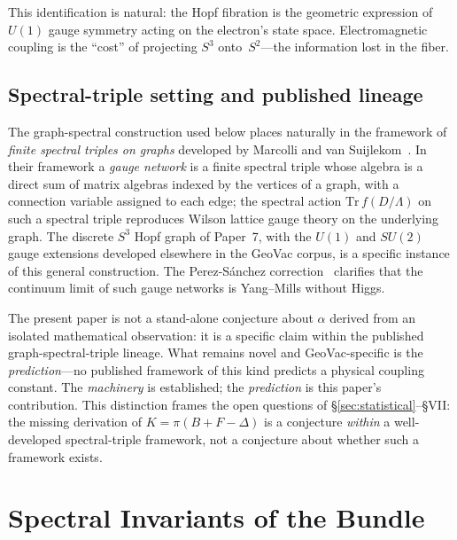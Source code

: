 \documentclass[aps,prl,twocolumn,superscriptaddress]{revtex4-2}
\begin{document}
This identification is natural: the Hopf fibration is the geometric
expression of $U(1)$ gauge symmetry acting on the electron's state
space. Electromagnetic coupling is the ``cost'' of projecting $S^3$
onto~$S^2$---the information lost in the fiber.


\subsection{Spectral-triple setting and published lineage}\label{sec:spectral_triple}

The graph-spectral construction used below places naturally in the
framework of \emph{finite spectral triples on graphs} developed by
Marcolli and van Suijlekom~\cite{marcolli_vs_2014}. In their framework
a \emph{gauge network} is a finite spectral triple whose algebra is a
direct sum of matrix algebras indexed by the vertices of a graph, with
a connection variable assigned to each edge; the spectral action
$\mathrm{Tr}\,f(D/\Lambda)$ on such a spectral triple reproduces Wilson
lattice gauge theory on the underlying graph. The discrete $S^3$ Hopf
graph of Paper~7, with the $U(1)$ and $SU(2)$ gauge extensions
developed elsewhere in the GeoVac corpus, is a specific instance of
this general construction. The Perez-S\'anchez
correction~\cite{perez_sanchez_2024, perez_sanchez_2024_comment}
clarifies that the continuum limit of such gauge networks is
Yang--Mills without Higgs.

The present paper is not a stand-alone conjecture about $\alpha$
derived from an isolated mathematical observation: it is a specific
claim within the published graph-spectral-triple lineage. What remains
novel and GeoVac-specific is the \emph{prediction}---no published
framework of this kind predicts a physical coupling constant. The
\emph{machinery} is established; the \emph{prediction} is this
paper's contribution. This distinction frames the open questions of
\S\ref{sec:statistical}--\S VII: the missing derivation of
$K = \pi(B + F - \Delta)$ is a conjecture \emph{within} a well-developed
spectral-triple framework, not a conjecture about whether such a
framework exists.


\section{Spectral Invariants of the Bundle}
\end{document}

